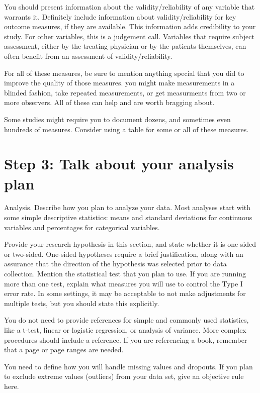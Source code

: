 \documentclass[
  letterpaper,
  DIV=11,
  numbers=noendperiod]{scrreprt}
\begin{document}
\begin{tcolorbox}
You should present information about the validity/reliability of any
variable that warrants it. Definitely include information about
validity/reliability for key outcome measures, if they are available.
This information adds credibility to your study. For other variables,
this is a judgement call. Variables that require subject assessment,
either by the treating physician or by the patients themselves, can
often benefit from an assessment of validity/reliability.

For all of these measures, be sure to mention anything special that you
did to improve the quality of those measures. you might make
measurements in a blinded fashion, take repeated measurements, or get
measurments from two or more observers. All of these can help and are
worth bragging about.

Some studies might require you to document dozens, and sometimes even
hundreds of measures. Consider using a table for some or all of these
measures.

\section{Step 3: Talk about your analysis
plan}\label{step-3-talk-about-your-analysis-plan}

Analysis. Describe how you plan to analyze your data. Most analyses
start with some simple descriptive statistics: means and standard
deviations for continuous variables and percentages for categorical
variables.

Provide your research hypothesis in this section, and state whether it
is one-sided or two-sided. One-sided hypotheses require a brief
justification, along with an assurance that the direction of the
hypothesis was selected prior to data collection. Mention the
statistical test that you plan to use. If you are running more than one
test, explain what measures you will use to control the Type I error
rate. In some settings, it may be acceptable to not make adjustments for
multiple tests, but you should state this explicitly.

You do not need to provide references for simple and commonly used
statistics, like a t-test, linear or logistic regression, or analysis of
variance. More complex procedures should include a reference. If you are
referencing a book, remember that a page or page ranges are needed.

You need to define how you will handle missing values and dropouts. If
you plan to exclude extreme values (outliers) from your data set, give
an objective rule here.


\end{tcolorbox}
\end{document}
